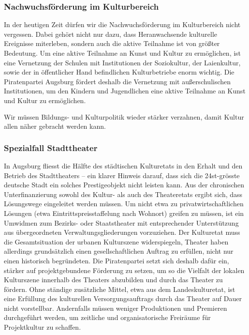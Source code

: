   \subsubsection{Nachwuchsförderung im Kulturbereich}
  
  In der heutigen Zeit dürfen wir die Nachwuchsförderung im Kulturbereich 
  nicht vergessen. Dabei gehört nicht nur dazu, dass Heranwachsende 
  kulturelle Ereignisse miterleben, sondern auch die aktive Teilnahme ist von 
  größter Bedeutung. Um eine aktive Teilnahme an Kunst und Kultur zu 
  ermöglichen, ist eine Vernetzung der Schulen mit Institutionen der 
  Soziokultur, der Laienkultur, sowie der in öffentlicher Hand befindlichen 
  Kulturbetriebe enorm wichtig. Die Piratenpartei Augsburg fördert deshalb die 
  Vernetzung mit außerschulischen Institutionen, um den Kindern und 
  Jugendlichen eine aktive Teilnahme an Kunst und Kultur zu ermöglichen.
  
  Wir müssen Bildungs- und Kulturpolitik wieder stärker verzahnen, damit 
  Kultur allen näher gebracht werden kann.
  
  \subsubsection{Spezialfall Stadttheater}
  
  In Augsburg fliesst die Hälfte des städtischen Kulturetats in den Erhalt 
  und den Betrieb des Stadttheaters -- ein klarer Hinweis darauf, dass sich 
  die 24st-grösste deutsche Stadt ein solches Prestigeobjekt nicht leisten 
  kann. Aus der chronischen Unterfinanzierung sowohl des Kultur- als auch des 
  Theateretats ergibt sich, dass Lösungswege eingeleitet werden müssen. Um 
  nicht etwa zu privatwirtschaftlichen Lösungen (etwa Eintrittspreisstaffelung 
  nach Wohnort) greifen zu müssen, ist ein Umwidmen zum Bezirks- oder 
  Staatstheater mit entsprechender Unterstützung aus übergeordneten 
  Verwaltungsgliederungen vorzuziehen. Der Kulturetat muss die 
  Gesamtsituation der urbanen Kulturszene widerspiegeln, Theater haben 
  allerdings grundsätzlich einen gesellschaftlichen Auftrag zu erfüllen, 
  nicht nur einen historisch begründeten. Die Piratenpartei setzt sich 
  deshalb dafür ein, stärker auf projektgebundene Förderung zu setzen, um so 
  die Vielfalt der lokalen Kulturszene innerhalb des Theaters abzubilden und 
  durch das Theater zu fördern. Ohne ständige zusätzliche Mittel, etwa aus 
  dem Landeskulturetat, ist eine Erfüllung des kulturellen 
  Versorgungsauftrags durch das Theater auf Dauer nicht vorstellbar. 
  Andernfalls müssen weniger Produktionen und Premieren durchgeführt werden, 
  um zeitliche und organisatorische Freiräume für Projektkultur zu schaffen.
  
